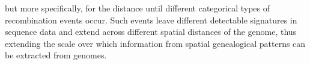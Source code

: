 \documentclass[11pt]{article}
\begin{document}
% 
% 
but more specifically, for the distance until different categorical types
of recombination events occur. Such events leave different detectable 
signatures in sequence data and extend across different spatial distances 
of the genome, thus extending the scale over which information from 
spatial genealogical patterns can be extracted from genomes.
% 
% 

\end{document}
